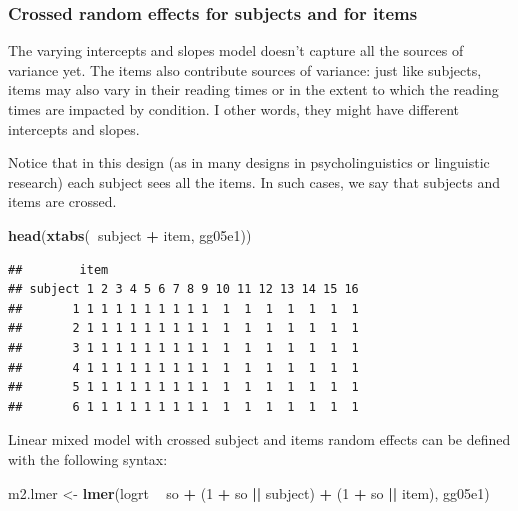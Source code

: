 \documentclass[12pt,]{krantz}
\newenvironment{Shaded}{\begin{snugshade}}{\end{snugshade}}
\newcommand{\DecValTok}[1]{\textcolor[rgb]{0.00,0.00,0.81}{#1}}
\newcommand{\KeywordTok}[1]{\textcolor[rgb]{0.13,0.29,0.53}{\textbf{#1}}}
\newcommand{\NormalTok}[1]{#1}
\newcommand{\OperatorTok}[1]{\textcolor[rgb]{0.81,0.36,0.00}{\textbf{#1}}}
\newcommand{\StringTok}[1]{\textcolor[rgb]{0.31,0.60,0.02}{#1}}
\begin{document}
\hypertarget{crossed-random-effects-for-subjects-and-for-items}{%
\subsubsection{Crossed random effects for subjects and for items}\label{crossed-random-effects-for-subjects-and-for-items}}

The varying intercepts and slopes model doesn't capture all the sources of variance yet. The items also contribute sources of variance: just like subjects, items may also vary in their reading times or in the extent to which the reading times are impacted by condition. I other words, they might have different intercepts and slopes.

Notice that in this design (as in many designs in psycholinguistics or linguistic research) each subject sees all the items. In such cases, we say that subjects and items are crossed.

\begin{Shaded}
\begin{Highlighting}[]
\KeywordTok{head}\NormalTok{(}\KeywordTok{xtabs}\NormalTok{(}\OperatorTok{~}\NormalTok{subject }\OperatorTok{+}\StringTok{ }\NormalTok{item, gg05e1))}
\end{Highlighting}
\end{Shaded}

\begin{verbatim}
##        item
## subject 1 2 3 4 5 6 7 8 9 10 11 12 13 14 15 16
##       1 1 1 1 1 1 1 1 1 1  1  1  1  1  1  1  1
##       2 1 1 1 1 1 1 1 1 1  1  1  1  1  1  1  1
##       3 1 1 1 1 1 1 1 1 1  1  1  1  1  1  1  1
##       4 1 1 1 1 1 1 1 1 1  1  1  1  1  1  1  1
##       5 1 1 1 1 1 1 1 1 1  1  1  1  1  1  1  1
##       6 1 1 1 1 1 1 1 1 1  1  1  1  1  1  1  1
\end{verbatim}

Linear mixed model with crossed subject and items random effects can be defined with the following syntax:

\begin{Shaded}
\begin{Highlighting}[]
\NormalTok{m2.lmer <-}\StringTok{ }\KeywordTok{lmer}\NormalTok{(logrt }\OperatorTok{~}\StringTok{ }\NormalTok{so }\OperatorTok{+}\StringTok{ }\NormalTok{(}\DecValTok{1} \OperatorTok{+}\StringTok{ }\NormalTok{so }\OperatorTok{||}\StringTok{ }\NormalTok{subject) }\OperatorTok{+}\StringTok{ }
\StringTok{  }\NormalTok{(}\DecValTok{1} \OperatorTok{+}\StringTok{ }\NormalTok{so }\OperatorTok{||}\StringTok{ }\NormalTok{item), gg05e1)}
\end{Highlighting}
\end{Shaded}
\end{document}
